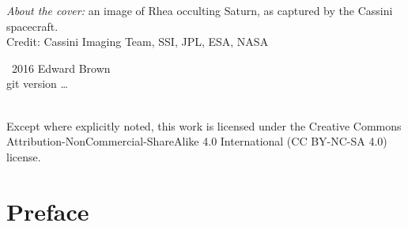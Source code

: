 
\maketitle
\newpage
\begin{fullwidth}
\thispagestyle{empty}

\vspace{3\baselineskip}
\noindent \emph{About the cover:} an image of Rhea occulting Saturn, as captured by the Cassini spacecraft.\\
\noindent Credit: Cassini Imaging Team, SSI, JPL, ESA, NASA

\vfill
\noindent \ccCopy\ 2016 Edward Brown\\
\noindent git version \ldots

\vspace{3\baselineskip}
\noindent \ccbyncsa \\
\noindent Except where explicitly noted, this work is licensed under the Creative Commons
Attribution-NonCommercial-ShareAlike 4.0 International (CC BY-NC-SA
4.0) license.

\end{fullwidth}
\newpage
\chapter*{Preface}


\tableofcontents
\listoffigures
\listofexercises
